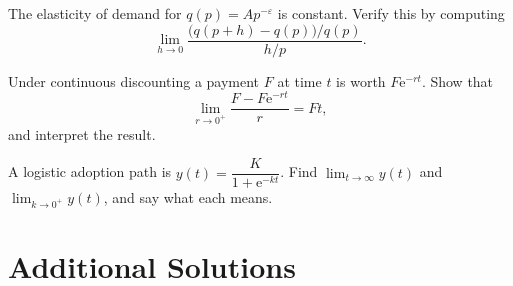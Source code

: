 \begin{problems}
  \item The elasticity of demand for $q(p)=A p^{-\varepsilon}$ is constant.
        Verify this by computing
        \[
          \lim_{h\to0}\frac{\bigl(q(p+h)-q(p)\bigr)/q(p)}{h/p} .
        \]
  \item Under continuous discounting a payment $F$ at time $t$ is worth
        $F\mathrm{e}^{-rt}$. Show that
        \[
          \lim_{r\to0^{+}}\frac{F-F\mathrm{e}^{-rt}}{r}=Ft ,
        \]
        and interpret the result.
  \item A logistic adoption path is
        $y(t)=\dfrac{K}{1+\mathrm{e}^{-kt}}$. Find
        $\displaystyle\lim_{t\to\infty}y(t)$ and
        $\displaystyle\lim_{k\to0^{+}}y(t)$, and say what each means.
\end{problems}

\section{Additional Solutions}

